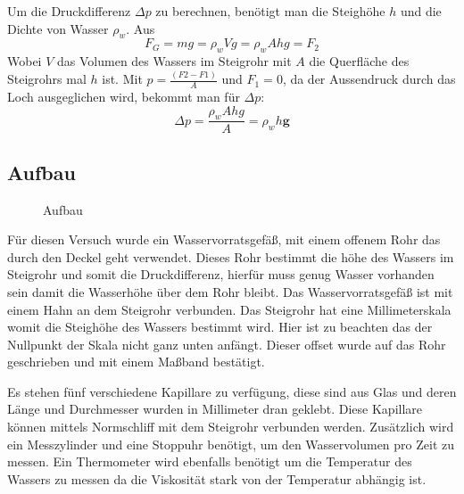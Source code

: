 \documentclass[11pt,a4paper]{article}
\renewcommand{\vec}{\boldsymbol}
\begin{document}
Um die Druckdifferenz $\Delta p$ zu berechnen, benötigt man die Steighöhe $h$ und die Dichte von Wasser $\rho_w$.
Aus
$$F_G = mg = \rho_w Vg = \rho_w Ahg = F_2$$
Wobei $V$ das Volumen des Wassers im Steigrohr mit $A$ die Querfläche des Steigrohrs mal $h$ ist.
Mit $p = \frac{(F2-F1)}{A}$ und $F_1 = 0$, da der Aussendruck durch das Loch ausgeglichen wird, bekommt man für $\Delta p$:
$$\Delta p = \frac{\rho_w Ahg}{A} = \rho_w h \vec{g}$$

\pagebreak

\subsection{Aufbau}

\begin{figure}[ht]
\centering
{}
   \renewcommand\thefigure{B1}
\caption[Aufbau]{Aufbau \cite{Anleitung}}
\label{Pic:1}
\end{figure}

Für diesen Versuch wurde ein Wasservorratsgefäß, mit einem offenem Rohr das durch den Deckel geht verwendet. Dieses Rohr bestimmt die höhe des Wassers im Steigrohr und somit die Druckdifferenz, hierfür muss genug Wasser vorhanden sein damit die Wasserhöhe über dem Rohr bleibt. Das Wasservorratsgefäß ist mit einem Hahn an dem Steigrohr verbunden. Das Steigrohr hat eine Millimeterskala womit die Steighöhe des Wassers bestimmt wird. Hier ist zu beachten das der Nullpunkt der Skala nicht ganz unten anfängt. Dieser offset wurde auf das Rohr geschrieben und mit einem Maßband bestätigt. 

Es stehen fünf verschiedene Kapillare zu verfügung, diese sind aus Glas und deren Länge und Durchmesser wurden in Millimeter dran geklebt. Diese Kapillare können mittels Normschliff mit dem Steigrohr verbunden werden. Zusätzlich wird ein Messzylinder und eine Stoppuhr benötigt, um den Wasservolumen pro Zeit zu messen. Ein Thermometer wird ebenfalls benötigt um die Temperatur des Wassers zu messen da die Viskosität stark von der Temperatur abhängig ist.
\end{document}
